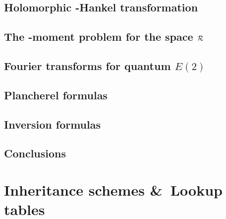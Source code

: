\documentclass[landscape]{book}
\begin{document}
\section{Holomorphic {\protect\qfragile}-Hankel transformation}
\label{sec:qHankel}




\section{The {\protect\qfragile}-moment problem for the space $\mathcal R$}

\section{Fourier transforms for quantum $E(2)$}

\section{Plancherel formulas}
\label{sect:plancherel}

\section{Inversion formulas}
\label{sect:inversion}

\section{Conclusions}



\appendix



\chapter{Inheritance schemes \&\ Lookup tables}
\label{app:inheritance}




\end{document}
